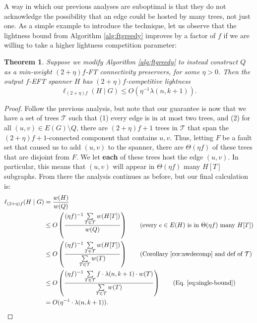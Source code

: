 \documentclass{article}
\theoremstyle{plain}
\newtheorem{theorem}{Theorem}
\theoremstyle{definition}
\newcommand{\tee}{\mathcal{T}}
\begin{document}
A way in which our previous analyses are suboptimal is that they do not acknowledge the possibility that an edge could be hosted by many trees, not just one.
As a simple example to introduce the technique, let us observe that the lightness bound from Algorithm \ref{alg:ftgreedy} improves by a factor of $f$ if we are willing to take a higher lightness competition parameter:
\begin{theorem} \label{thm:high-parameter-lightness}
Suppose we modify Algorithm \ref{alg:ftgreedy} to instead construct $Q$ as a min-weight $(2+\eta)f$-FT connectivity preservers, for some $\eta >0$.
Then the output $f$-EFT spanner $H$ has $(2+\eta)f$-competitive lightness
$$ \ell_{(2+\eta)f}(H \mid G) \le O\left( \eta^{-1} \lambda(n, k+1)\right).$$
\end{theorem}
\begin{proof}
Follow the previous analysis, but note that our guarantee is now that we have a set of trees $\tee$ such that (1) every edge is in at most two trees, and (2) for all $(u, v) \in E(G) \setminus Q$, there are $(2+\eta)f+1$ trees in $\tee$ that span the $(2+\eta)f+1$-connected component that contains $u, v$.
Thus, letting $F$ be a fault set that caused us to add $(u, v)$ to the spanner, there are $\Theta(\eta f)$ of these trees that are disjoint from $F$.
We let \textbf{each} of these trees host the edge $(u, v)$.
In particular, this means that $(u, v)$ will appear in $\Theta(\eta f)$ many $H[T]$ subgraphs.
From there the analysis continues as before, but our final calculation is:
\begin{align*}
\ell_{(2+\eta)f}(H \mid G) &= \frac{w(H)}{w(Q)}\\
&\leq O\left(\frac{(\eta f)^{-1} \sum \limits_{T \in \tee} w(H[T])}{w(Q)}\right) \tag{every $e \in E(H)$ is in $\Theta(\eta f)$ many $H[T]$} \\ 
&\leq O\left(\frac{(\eta f)^{-1} \sum \limits_{T \in \tee} w(H[T])}{\sum \limits_{T \in \tee} w(T)}\right) \tag{Corollary~\ref{cor:nwdecomp} and def of $\tee$}\\
&\le  O\left( \frac{(\eta f)^{-1} \sum \limits_{T \in \tee} f \cdot \lambda(n, k+1) \cdot w(T)}{\sum \limits_{T \in \tee} w(T)} \right) \tag{Eq.~\eqref{eq:single-bound}}\\
&= O(\eta^{-1} \cdot \lambda(n, k+1)). \tag*{\qedhere}
\end{align*}
\end{proof}
\end{document}
